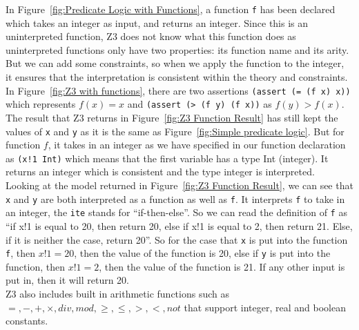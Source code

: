 \documentclass[a4paper]{report}
\begin{document}
In Figure~\ref{fig:Predicate Logic with Functions}, a function \texttt{f} has been declared which takes an integer as input, and returns an integer. Since this is an uninterpreted function, Z3 does not know what this function does as uninterpreted functions only have two properties: its function name and its arity. But we can add some constraints, so when we apply the function to the integer, it ensures that the interpretation is consistent within the theory and constraints. \\

In Figure~\ref{fig:Z3 with functions}, there are two assertions \texttt{(assert (= (f x) x))} which represents $f(x) = x$ and \texttt{(assert (> (f y) (f x))} as $f(y) > f(x)$. The result that Z3 returns in Figure~\ref{fig:Z3 Function Result} has still kept the values of \texttt{x} and \texttt{y} as it is the same as Figure~\ref{fig:Simple predicate logic}. But for function $f$, it takes in an integer as we have specified in our function declaration as \texttt{(x!1 Int)} which means that the first variable has a type Int (integer). It returns an integer which is consistent and the type integer is interpreted. \\

Looking at the model returned in Figure~\ref{fig:Z3 Function Result}, we can see that \texttt{x} and \texttt{y} are both interpreted as a function as well as \texttt{f}. It interprets \texttt{f} to take in an integer, the \texttt{ite} stands for ``if-then-else''. So we can read the definition of \texttt{f} as ``if x!1 is equal to 20, then return 20, else if x!1 is equal to 2, then return 21. Else, if it is neither the case, return 20''. So for the case that \texttt{x} is put into the function \texttt{f}, then $x!1 = 20$, then the value of the function is 20, else if \texttt{y} is put into the function, then $x!1 = 2$, then the value of the function is 21. If any other input is put in, then it will return 20. \\

Z3 also includes built in arithmetic functions such as $=, -, +, \times, div, mod, \geq, \leq, >, <, not$ that support integer, real and boolean constants. \\
\end{document}
